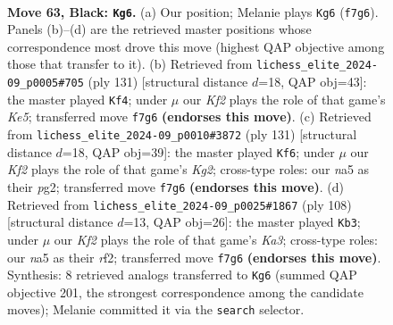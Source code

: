 \documentclass[11pt]{article}
\begin{document}
\clearpage

\begin{figure}[p]\centering
\begin{subfigure}{0.46\textwidth}\centering
\resizebox{\linewidth}{!}{%
\newchessgame
\chessboard[
  setfen={8/5kp1/3R1p2/N6p/3P3P/2r3PK/8/8 b - - 20 63},
  showmover=false,
  pgfstyle=straightmove, color=movearrow, markmove={f7-g6}
]}
\caption{}
\end{subfigure}\hfill
\begin{subfigure}{0.46\textwidth}\centering
\resizebox{\linewidth}{!}{%
\newchessgame
\chessboard[
  setfen={8/8/8/1R3pp1/p3k3/P6P/1P1r1PK1/8 b - - 56 66},
  showmover=false,
  pgfstyle=straightmove, color=movearrow, markmove={e4-f4}
]}
\caption{}
\end{subfigure}
\\[4pt]
\begin{subfigure}{0.46\textwidth}\centering
\resizebox{\linewidth}{!}{%
\newchessgame
\chessboard[
  setfen={8/R4pk1/6p1/7p/4P2P/5PK1/6P1/7r b - - 18 66},
  showmover=false,
  pgfstyle=straightmove, color=movearrow, markmove={g7-f6}
]}
\caption{}
\end{subfigure}\hfill
\begin{subfigure}{0.46\textwidth}\centering
\resizebox{\linewidth}{!}{%
\newchessgame
\chessboard[
  setfen={8/8/pkpR4/3p4/1P1P4/K1P5/5r2/2r5 w - - 3 55},
  showmover=false,
  pgfstyle=straightmove, color=movearrow, markmove={a3-b3}
]}
\caption{}
\end{subfigure}
\caption{\textbf{Move 63, Black: \texttt{Kg6}.} (a) Our position; Melanie plays \texttt{Kg6} (\texttt{f7g6}). Panels (b)--(d) are the retrieved master positions whose correspondence most drove this move (highest QAP objective among those that transfer to it). (b) Retrieved from \texttt{lichess\_elite\_2024-09\_p0005\#705} (ply 131) [structural distance $d$=18, QAP obj=43]: the master played \texttt{Kf4}; under $\mu$ our \emph{Kf2} plays the role of that game's \emph{Ke5}; transferred move \texttt{f7g6} \textbf{(endorses this move)}. (c) Retrieved from \texttt{lichess\_elite\_2024-09\_p0010\#3872} (ply 131) [structural distance $d$=18, QAP obj=39]: the master played \texttt{Kf6}; under $\mu$ our \emph{Kf2} plays the role of that game's \emph{Kg2}; cross-type roles: our \emph{n}a5 as their \emph{p}g2; transferred move \texttt{f7g6} \textbf{(endorses this move)}. (d) Retrieved from \texttt{lichess\_elite\_2024-09\_p0025\#1867} (ply 108) [structural distance $d$=13, QAP obj=26]: the master played \texttt{Kb3}; under $\mu$ our \emph{Kf2} plays the role of that game's \emph{Ka3}; cross-type roles: our \emph{n}a5 as their \emph{r}f2; transferred move \texttt{f7g6} \textbf{(endorses this move)}. Synthesis: 8 retrieved analogs transferred to \texttt{Kg6} (summed QAP objective 201, the strongest correspondence among the candidate moves); Melanie committed it via the \texttt{search} selector.}
\label{fig:thought-m125}
\end{figure}
\end{document}
